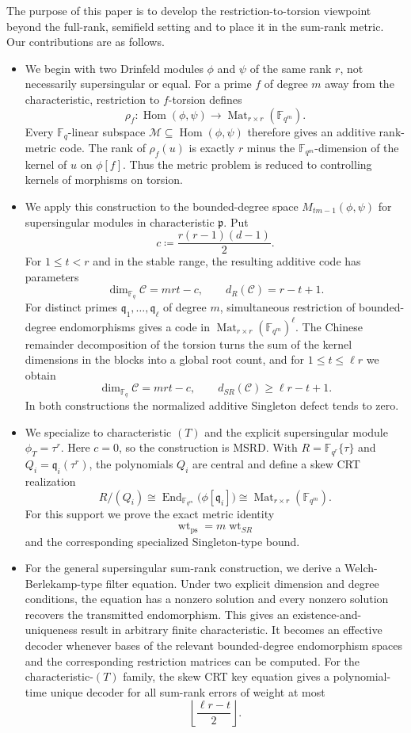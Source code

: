 \documentclass[10pt,a4paper]{amsart}
\DeclareMathOperator{\End}{End}
\DeclareMathOperator{\Hom}{Hom}
\DeclareMathOperator{\Mat}{Mat}
\DeclareMathOperator{\wt}{wt}
\theoremstyle{definition}
\theoremstyle{plain}
\theoremstyle{remark}
\newcommand{\vF}{\mathbb F}
\begin{document}
The purpose of this paper is to develop the restriction-to-torsion viewpoint
beyond the full-rank, semifield setting and to place it in the sum-rank
metric.  Our contributions are as follows.

\begin{itemize}
\item We begin with two Drinfeld modules $\phi$ and $\psi$ of the same rank
$r$, not necessarily supersingular or equal. For a prime $f$ of degree $m$
away from the characteristic, restriction to $f$-torsion defines
$$
\rho_f:\Hom(\phi,\psi)
\longrightarrow
\Mat_{r\times r}(\vF_{q^m}).
$$
Every $\vF_q$-linear subspace $\mathcal M\subseteq\Hom(\phi,\psi)$ therefore
gives an additive rank-metric code. The rank of $\rho_f(u)$ is exactly $r$
minus the $\vF_{q^m}$-dimension of the kernel of $u$ on $\phi[f]$. Thus the
metric problem is reduced to controlling kernels of morphisms on torsion.

\item We apply this construction to the bounded-degree space
$M_{tm-1}(\phi,\psi)$ for supersingular modules in characteristic
$\mathfrak p$. Put
$$
c\coloneqq \frac{r(r-1)(d-1)}{2}.
$$
For $1\leq t<r$ and in the stable range, the resulting additive code has
parameters
$$
\dim_{\vF_q}\mathcal C=mrt-c,
\qquad
d_R(\mathcal C)=r-t+1.
$$
For distinct primes $\mathfrak q_1,\ldots,\mathfrak q_\ell$ of degree $m$,
simultaneous restriction of bounded-degree endomorphisms gives a code in
$\Mat_{r\times r}(\vF_{q^m})^\ell$.  The Chinese remainder decomposition of
the torsion turns the sum of the kernel dimensions in the blocks into a
global root count, and for $1\leq t\leq \ell r$ we obtain
$$
\dim_{\vF_q}\mathcal C=mrt-c,
\qquad
d_{SR}(\mathcal C)\geq \ell r-t+1.
$$
In both constructions the normalized additive Singleton defect tends to zero.

\item We specialize to characteristic $(T)$ and the explicit supersingular
module $\phi_T=\tau^r$. Here $c=0$, so the construction is MSRD. With
$R=\vF_{q^r}\{\tau\}$ and $Q_i=\mathfrak q_i(\tau^r)$, the polynomials $Q_i$
are central and define a skew CRT realization
$$
R/(Q_i)
\cong
\End_{\vF_{q^m}}\bigl(\phi[\mathfrak q_i]\bigr)
\cong
\Mat_{r\times r}(\vF_{q^m}).
$$
For this support we prove the exact metric identity
$$
\wt_{\mathrm{ps}}=m\wt_{SR}
$$
and the corresponding specialized Singleton-type bound.

\item For the general supersingular sum-rank construction, we derive a
Welch-Berlekamp-type filter equation.  Under two explicit dimension and
degree conditions, the equation has a nonzero solution and every nonzero
solution recovers the transmitted endomorphism.  This gives an
existence-and-uniqueness result in arbitrary finite characteristic.  It
becomes an effective decoder whenever bases of the relevant bounded-degree
endomorphism spaces and the corresponding restriction matrices can be
computed. For the characteristic-$(T)$ family, the skew CRT key equation gives
a polynomial-time
unique decoder for all sum-rank errors of weight at most
$$
\left\lfloor\frac{\ell r-t}{2}\right\rfloor.
$$
\end{itemize}
\end{document}

